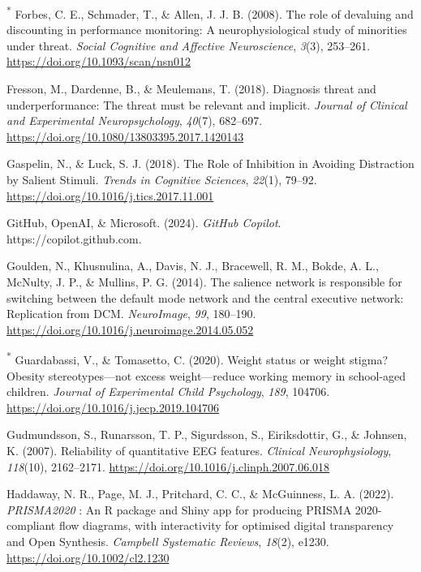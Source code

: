 \documentclass[
  stu, a4paper, 12pt,mask,floatsintext]{apa7}
\newlength{\cslhangindent}
\newenvironment{CSLReferences}[2] %
 {\begin{list}{}{%
  \setlength{\itemindent}{0pt}
  \setlength{\leftmargin}{0pt}
  \setlength{\parsep}{0pt}
  \ifodd #1
   \setlength{\leftmargin}{\cslhangindent}
   \setlength{\itemindent}{-1\cslhangindent}
  \fi
  \setlength{\itemsep}{#2\baselineskip}}}
 {\end{list}}
\begin{document}
\begin{CSLReferences}{1}{0}
\textsuperscript{*} Forbes, C. E., Schmader, T., \& Allen, J. J. B. (2008). The role of devaluing and discounting in performance monitoring: A neurophysiological study of minorities under threat. \emph{Social Cognitive and Affective Neuroscience}, \emph{3}(3), 253--261. \url{https://doi.org/10.1093/scan/nsn012}

Fresson, M., Dardenne, B., \& Meulemans, T. (2018). Diagnosis threat and underperformance: {The} threat must be relevant and implicit. \emph{Journal of Clinical and Experimental Neuropsychology}, \emph{40}(7), 682--697. \url{https://doi.org/10.1080/13803395.2017.1420143}

Gaspelin, N., \& Luck, S. J. (2018). The {Role} of {Inhibition} in {Avoiding Distraction} by {Salient Stimuli}. \emph{Trends in Cognitive Sciences}, \emph{22}(1), 79--92. \url{https://doi.org/10.1016/j.tics.2017.11.001}

GitHub, OpenAI, \& Microsoft. (2024). \emph{{GitHub Copilot}}. https://copilot.github.com.

Goulden, N., Khusnulina, A., Davis, N. J., Bracewell, R. M., Bokde, A. L., McNulty, J. P., \& Mullins, P. G. (2014). The salience network is responsible for switching between the default mode network and the central executive network: {Replication} from {DCM}. \emph{NeuroImage}, \emph{99}, 180--190. \url{https://doi.org/10.1016/j.neuroimage.2014.05.052}

\textsuperscript{*} Guardabassi, V., \& Tomasetto, C. (2020). Weight status or weight stigma? {Obesity} stereotypes---not excess weight---reduce working memory in school-aged children. \emph{Journal of Experimental Child Psychology}, \emph{189}, 104706. \url{https://doi.org/10.1016/j.jecp.2019.104706}

Gudmundsson, S., Runarsson, T. P., Sigurdsson, S., Eiriksdottir, G., \& Johnsen, K. (2007). Reliability of quantitative {EEG} features. \emph{Clinical Neurophysiology}, \emph{118}(10), 2162--2171. \url{https://doi.org/10.1016/j.clinph.2007.06.018}

Haddaway, N. R., Page, M. J., Pritchard, C. C., \& McGuinness, L. A. (2022). {\emph{PRISMA2020}} : {An R} package and {Shiny} app for producing {PRISMA} 2020-compliant flow diagrams, with interactivity for optimised digital transparency and {Open Synthesis}. \emph{Campbell Systematic Reviews}, \emph{18}(2), e1230. \url{https://doi.org/10.1002/cl2.1230}


\end{CSLReferences}
\end{document}
